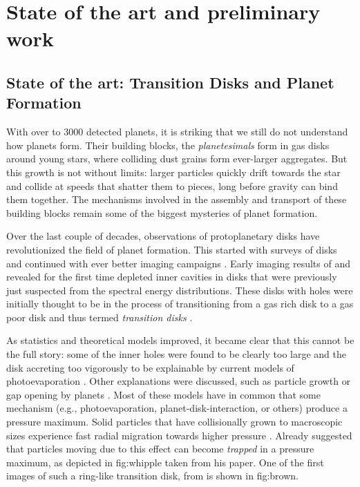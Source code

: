 \documentclass[10pt,fleqn,twoside]{article}
\newcommand{\cref}[1]{#1}
\begin{document}
\section{State of the art and preliminary work}

\subsection*{State of the art: Transition Disks and Planet Formation}

With over to 3000 detected planets, it is striking that we still do
not understand how planets form. Their building blocks, the
\textit{planetesimals} form in gas disks around young stars, where
colliding dust grains form ever-larger aggregates. But this growth is
not without limits: larger particles quickly drift towards the star
and collide at speeds that shatter them to pieces, long before gravity
can bind them together. The mechanisms involved in the assembly and
transport of these building blocks remain some of the biggest
mysteries of planet formation.

Over the last couple of decades, observations of protoplanetary disks
have revolutionized the field of planet formation. This started with
surveys of disks \citep[see the review of][]{2011ARA&A..49...67W} and
continued with ever better imaging campaigns \citep[e.g.,][and many
others]{2007ApJ...659..705A,2009ApJ...704..496B}.
Early imaging results of \citet{2008ApJ...675L.109B} and
\citet{2009ApJ...704..496B} revealed for the first time depleted inner
cavities in disks that were previously just suspected from the
spectral energy distributions. These disks with holes were initially
thought to be in the process of transitioning from a gas rich disk
to a gas poor disk \cite[e.g.][]{2001MNRAS.328..485C} and thus termed
\textit{transition disks} \citep[see][and references
therein]{2014prpl.conf..497E,2014prpl.conf..475A}.

As statistics and theoretical models improved, it became clear that
this cannot be the full story: some of the inner holes were found to
be clearly too large and the disk accreting too vigorously to be
explainable by current models of photoevaporation
\citep[i.e. Type 2 TDs,][]{2010MNRAS.401.1415O,2011MNRAS.412...13O}.
Other explanations were discussed, such as particle growth
\citep{2005A&A...434..971D,2005ApJ...625..414T,2012A&A...544A..79B} or
gap opening by planets
\citep{2004A&A...425L...9P,2006A&A...453.1129P,2006MNRAS.373.1619R,
2012A&A...545A..81P,2012ApJ...755....6Z}. Most of these models have in
common that some mechanism (e.g., photoevaporation,
planet-disk-interaction, or others) produce a pressure maximum.
Solid particles that have collisionally grown to macroscopic sizes
experience fast radial migration towards higher pressure
\citep{1972fpp..conf..211W,1977MNRAS.180...57W,1986Icar...67..375N}.
Already \citet{1972fpp..conf..211W} suggested that particles moving
due to this effect can become \textit{trapped} in a pressure maximum,
as depicted in \cref{fig:whipple} taken from his paper. One of the
first images of such a ring-like transition disk, from
\cite{2009ApJ...704..496B} is shown in \cref{fig:brown}.
\end{document}
